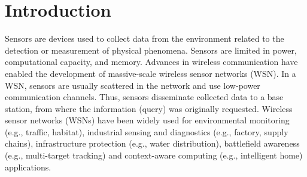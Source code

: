 \documentclass[conference]{IEEEtran}
\begin{document}





%
\IEEEpeerreviewmaketitle



\section{Introduction}


Sensors are devices used to collect data from the environment related to the
detection or measurement of physical phenomena. Sensors are limited in power,
computational capacity, and memory. Advances in wireless communication have
enabled the development of massive-scale wireless sensor networks (WSN). In a
WSN, sensors are usually scattered in the network and use low-power
communication channels. Thus, sensors disseminate collected data to a base
station, from where the information (query) was originally requested. Wireless
sensor networks (WSNs) have been widely used for environmental monitoring (e.g.,
traffic, habitat), industrial sensing and diagnostics (e.g., factory, supply
chains), infrastructure protection (e.g., water distribution), battlefield
awareness (e.g., multi-target tracking) and context-aware computing (e.g.,
intelligent home) applications.


\end{document}
